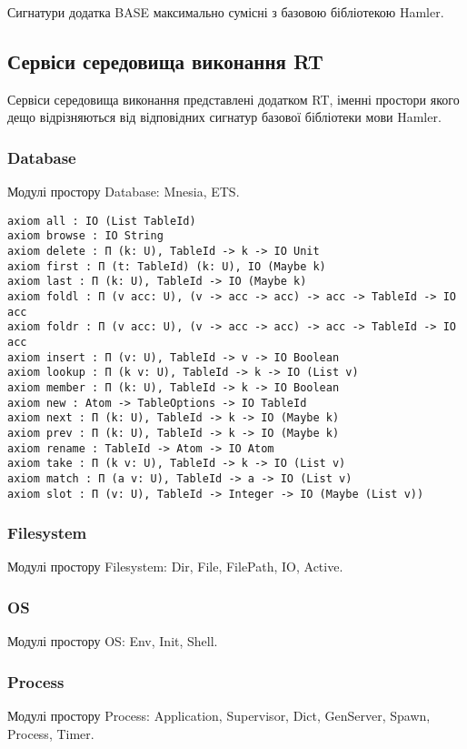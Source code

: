 Сигнатури додатка BASE максимально сумісні з базовою бібліотекою Hamler.

\subsection{Сервіси середовища виконання RT}
Сервіси середовища виконання представлені додатком RT, іменні простори якого
дещо відрізняються від відповідних сигнатур базової бібліотеки мови Hamler.

\subsubsection{Database}
Модулі простору Database: Mnesia, ETS.

\begin{lstlisting}
axiom all : IO (List TableId)
axiom browse : IO String
axiom delete : Π (k: U), TableId -> k -> IO Unit
axiom first : Π (t: TableId) (k: U), IO (Maybe k)
axiom last : Π (k: U), TableId -> IO (Maybe k)
axiom foldl : Π (v acc: U), (v -> acc -> acc) -> acc -> TableId -> IO acc
axiom foldr : Π (v acc: U), (v -> acc -> acc) -> acc -> TableId -> IO acc
axiom insert : Π (v: U), TableId -> v -> IO Boolean
axiom lookup : Π (k v: U), TableId -> k -> IO (List v)
axiom member : Π (k: U), TableId -> k -> IO Boolean
axiom new : Atom -> TableOptions -> IO TableId
axiom next : Π (k: U), TableId -> k -> IO (Maybe k)
axiom prev : Π (k: U), TableId -> k -> IO (Maybe k)
axiom rename : TableId -> Atom -> IO Atom
axiom take : Π (k v: U), TableId -> k -> IO (List v)
axiom match : Π (a v: U), TableId -> a -> IO (List v)
axiom slot : Π (v: U), TableId -> Integer -> IO (Maybe (List v))
\end{lstlisting}

\subsubsection{Filesystem}
Модулі простору Filesystem: Dir, File, FilePath, IO, Active.

\subsubsection{OS}
Модулі простору OS: Env, Init, Shell.

\subsubsection{Process}
Модулі простору Process: Application, Supervisor, Dict, GenServer, Spawn, Process, Timer.


